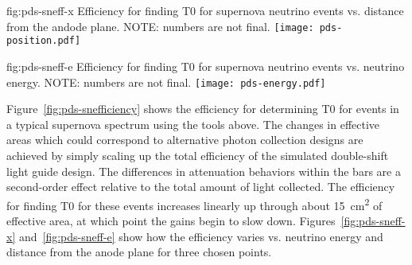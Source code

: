 \begin{dunefigure}{fig:pds-sneff-x}
{Efficiency for finding T0 for supernova neutrino events vs. distance from the andode plane. NOTE: numbers are not final.}
  \texttt{[image: pds-position.pdf]}
\end{dunefigure}

\begin{dunefigure}{fig:pds-sneff-e}
{Efficiency for finding T0 for supernova neutrino events vs. neutrino energy. NOTE: numbers are not final.}
  \texttt{[image: pds-energy.pdf]}
\end{dunefigure}

Figure~\ref{fig:pds-snefficiency} shows the efficiency for determining T0 for events in a typical supernova spectrum using the tools above. The changes in effective areas which could correspond to alternative photon collection designs are achieved by simply scaling up the total efficiency of the simulated double-shift light guide design. The differences in attenuation behaviors within the bars are a second-order effect relative to the total amount of light collected. The efficiency for finding T0 for these events increases linearly up through about \SI{15}{cm^2} of effective area, at which point the gains begin to slow down. Figures~\ref{fig:pds-sneff-x} and~\ref{fig:pds-sneff-e} show how the efficiency varies vs. neutrino energy and distance from the anode plane for three chosen points.
